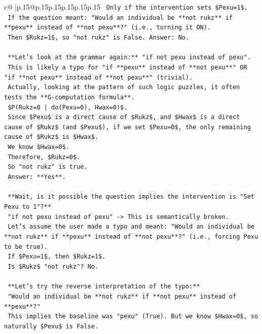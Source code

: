 \documentclass{article}
\begin{document}
{\begin{supertabular}{c@{$\;$}|p{.15\linewidth}@{}p{.15\linewidth}p{.15\linewidth}p{.15\linewidth}p{.15\linewidth}p{.15\linewidth}}
{{{\texttt{        Only if the intervention sets \$Pexu=1\$.} \\
\texttt{        If the question meant: "Would an individual be **not rukz** if **pexu** instead of **not pexu**?" (i.e., turning it ON).} \\
\texttt{        Then \$Rukz=1\$, so "not rukz" is False. Answer: No.} \\
\\ 
\texttt{        **Let's look at the grammar again:** "if not pexu instead of pexu".} \\
\texttt{        This is likely a typo for "if **pexu** instead of **not pexu**" OR "if **not pexu** instead of **not pexu**" (trivial).} \\
\texttt{        Actually, looking at the pattern of such logic puzzles, it often tests the **G{-}computation formula**.} \\
\texttt{        \$P(Rukz=0 | do(Pexu=0), Hwax=0)\$.} \\
\texttt{        Since \$Pexu\$ is a direct cause of \$Rukz\$, and \$Hwax\$ is a direct cause of \$Rukz\$ (and \$Pexu\$), if we set \$Pexu=0\$, the only remaining cause of \$Rukz\$ is \$Hwax\$.} \\
\texttt{        We know \$Hwax=0\$.} \\
\texttt{        Therefore, \$Rukz=0\$.} \\
\texttt{        So "not rukz" is true.} \\
\texttt{        Answer: **Yes**.} \\
\\ 
\texttt{        **Wait, is it possible the question implies the intervention is "Set Pexu to 1"?**} \\
\texttt{        "if not pexu instead of pexu" {-}> This is semantically broken.} \\
\texttt{        Let's assume the user made a typo and meant: "Would an individual be **not rukz** if **pexu** instead of **not pexu**?" (i.e., forcing Pexu to be true).} \\
\texttt{        If \$Pexu=1\$, then \$Rukz=1\$.} \\
\texttt{        Is \$Rukz\$ "not rukz"? No.} \\
\\ 
\texttt{        **Let's try the reverse interpretation of the typo:**} \\
\texttt{        "Would an individual be **not rukz** if **not pexu** instead of **pexu**?"} \\
\texttt{        This implies the baseline was "pexu" (True). But we know \$Hwax=0\$, so naturally \$Pexu\$ is False.} \\
}}}
\end{supertabular}}
\end{document}
